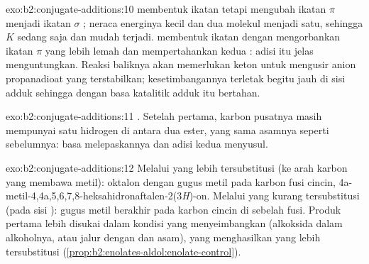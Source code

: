 \begin{solution}{exo:b2:conjugate-additions:10}
 membentuk ikatan  tetapi mengubah ikatan $\pi$  menjadi
ikatan $\sigma$ ; neraca energinya kecil dan dua molekul menjadi
satu, sehingga $K$ sedang saja dan  mudah terjadi. 
membentuk ikatan  dengan mengorbankan ikatan $\pi$  yang
lebih lemah dan mempertahankan kedua
: adisi itu jelas menguntungkan. Reaksi baliknya akan memerlukan
 keton untuk mengusir anion propanadioat yang terstabilkan;
kesetimbangannya terletak begitu jauh di sisi adduk sehingga dengan basa
katalitik adduk itu bertahan.
\end{solution}

\begin{solution}{exo:b2:conjugate-additions:11}
. Setelah  pertama, karbon
pusatnya masih mempunyai satu hidrogen di antara dua ester, yang sama
asamnya seperti sebelumnya: basa melepaskannya dan adisi kedua menyusul.
\end{solution}

\begin{solution}{exo:b2:conjugate-additions:12}
Melalui  yang lebih tersubstitusi (ke arah karbon yang membawa metil):
oktalon dengan gugus metil pada karbon fusi cincin,
4a-metil-4,4a,5,6,7,8-heksahidronaftalen-2(3\textit{H})-on. Melalui 
yang kurang tersubstitusi (pada sisi ): gugus metil berakhir pada
karbon cincin di sebelah fusi. Produk pertama lebih disukai dalam kondisi
yang menyeimbangkan (alkoksida dalam alkoholnya, atau jalur  dengan
 dan asam), yang menghasilkan  yang lebih
tersubstitusi (\cref{prop:b2:enolates-aldol:enolate-control}).
\end{solution}

